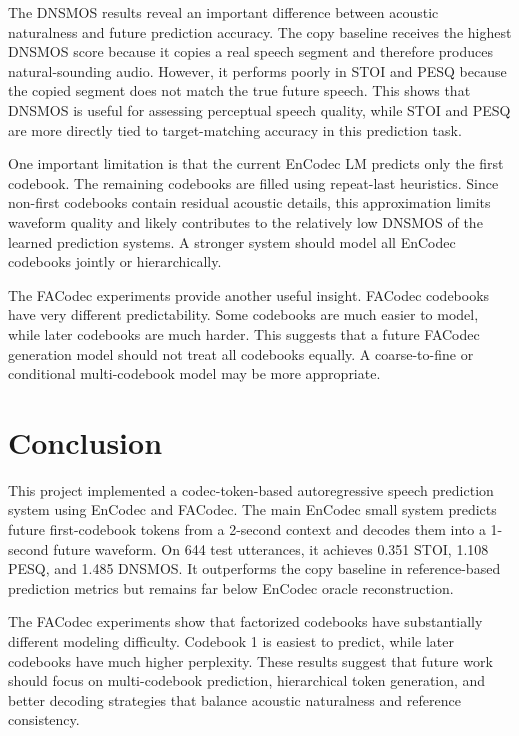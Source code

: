 \documentclass{article}
\begin{document}
	The DNSMOS results reveal an important difference between acoustic naturalness and future prediction accuracy. The copy baseline receives the highest DNSMOS score because it copies a real speech segment and therefore produces natural-sounding audio. However, it performs poorly in STOI and PESQ because the copied segment does not match the true future speech. This shows that DNSMOS is useful for assessing perceptual speech quality, while STOI and PESQ are more directly tied to target-matching accuracy in this prediction task.
	
	One important limitation is that the current EnCodec LM predicts only the first codebook. The remaining codebooks are filled using repeat-last heuristics. Since non-first codebooks contain residual acoustic details, this approximation limits waveform quality and likely contributes to the relatively low DNSMOS of the learned prediction systems. A stronger system should model all EnCodec codebooks jointly or hierarchically.
	
	The FACodec experiments provide another useful insight. FACodec codebooks have very different predictability. Some codebooks are much easier to model, while later codebooks are much harder. This suggests that a future FACodec generation model should not treat all codebooks equally. A coarse-to-fine or conditional multi-codebook model may be more appropriate.
	
	\section{Conclusion}
	\label{sec:conclusion}
	
	This project implemented a codec-token-based autoregressive speech prediction system using EnCodec and FACodec. The main EnCodec small system predicts future first-codebook tokens from a 2-second context and decodes them into a 1-second future waveform. On 644 test utterances, it achieves 0.351 STOI, 1.108 PESQ, and 1.485 DNSMOS. It outperforms the copy baseline in reference-based prediction metrics but remains far below EnCodec oracle reconstruction.
	
	The FACodec experiments show that factorized codebooks have substantially different modeling difficulty. Codebook 1 is easiest to predict, while later codebooks have much higher perplexity. These results suggest that future work should focus on multi-codebook prediction, hierarchical token generation, and better decoding strategies that balance acoustic naturalness and reference consistency.
	
\end{document}
